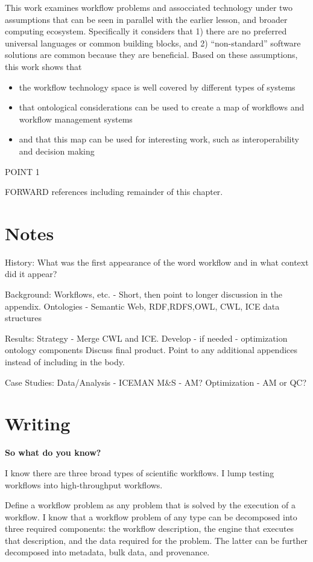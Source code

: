This work examines workflow problems and assocciated technology under two
assumptions that can be seen in parallel with the earlier lesson, and broader
computing ecosystem. Specifically it considers that 1) there are no preferred
universal languages or common building blocks, and 2) ``non-standard''
software solutions are common because they are beneficial. Based on these
assumptions, this work shows that 
\begin{itemize}
  \item the workflow technology space is well covered by different types
  of systems
  \item that ontological considerations can be used to create a map of
  workflows and workflow management systems
  \item and that this map can be used for interesting work, such as
  interoperability and decision making
\end{itemize}

POINT 1

FORWARD references including remainder of this chapter.

\section{Notes}

History:
What was the first appearance of the word workflow and in what context did it
appear?

Background:
Workflows, etc. - Short, then point to longer discussion in the appendix.
Ontologies - Semantic Web, {RDF,RDFS,OWL}, CWL, ICE data structures

Results:
Strategy - Merge CWL and ICE. Develop - if needed - optimization ontology components
Discuss final product. Point to any additional appendices instead of including in the body.

Case Studies:
Data/Analysis - ICEMAN
M\&S - AM?
Optimization - AM or QC?

\section{Writing}

\textbf{So what do you know?}

I know there are three broad types of scientific workflows. I lump testing workflows into high-throughput workflows.

Define a workflow problem as any problem that is solved by the execution of a workflow. I know that a workflow problem of any type can be decomposed into three required components: the workflow description, the engine that executes that description, and the data required for the problem. The latter can be further decomposed into metadata, bulk data, and provenance. 

